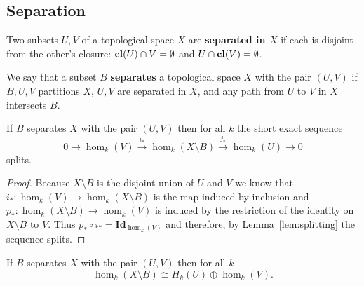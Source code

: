 
\subsection{Separation}

\begin{definition}[Separated]
  Two subsets $U, V$ of a topological space $X$ are \textbf{separated in $X$} if each is disjoint from the other's closure: $\mathbf{cl}(U)\cap V =\emptyset$ and $U\cap\mathbf{cl}(V) = \emptyset$.
\end{definition}

\begin{definition}[Separation]
  We say that a subset $B$ \textbf{separates} a topological space $X$ with the pair $(U, V)$ if $B, U, V$ partitions $X$, $U, V$ are separated in $X$, and any path from $U$ to $V$ in $X$ intersects $B$.
\end{definition}

\begin{lemma}\label{lem:separate_splits}
  If $B$ separates $X$ with the pair $(U, V)$ then for all $k$ the short exact sequence
  \[ 0\to \hom_k(V)\xrightarrow{i_*} \hom_k(X\setminus B)\xrightarrow{j_*} \hom_k(U)\to 0\]
  splits.
\end{lemma}
\begin{proof}
  Because $X\setminus B$ is the disjoint union of $U$ and $V$ we know that $i_* : \hom_k(V)\to \hom_k(X\setminus B)$ is the map induced by inclusion and $p_* : \hom_k(X\setminus B)\to \hom_k(V)$ is induced by the restriction of the identity on $X\setminus B$ to $V$.
  Thus $p_*\circ i_* = \mathbf{Id}_{\hom_k(V)}$ and therefore, by Lemma~\ref{lem:splitting} the sequence splits.%
\end{proof}

\begin{corollary}\label{cor:oplus_separates}
    If $B$ separates $X$ with the pair $(U, V)$ then for all $k$
    \[ \hom_k(X\setminus B) \cong H_k(U)\oplus \hom_k(V). \]
\end{corollary}

